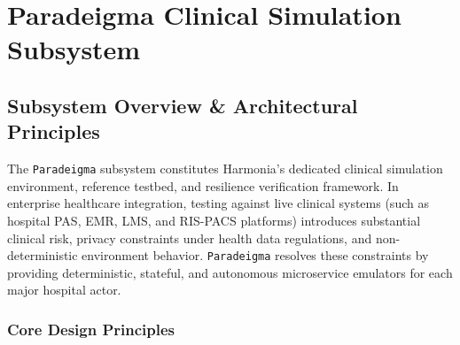 
\chapter{Paradeigma Clinical Simulation Subsystem}
\label{app:paradeigma}

\section{Subsystem Overview \& Architectural Principles}
\label{sec:paradeigma_overview}

The \texttt{Paradeigma} subsystem constitutes Harmonia's dedicated clinical simulation environment, reference testbed, and resilience verification framework. In enterprise healthcare integration, testing against live clinical systems (such as hospital PAS, EMR, LMS, and RIS-PACS platforms) introduces substantial clinical risk, privacy constraints under health data regulations, and non-deterministic environment behavior. \texttt{Paradeigma} resolves these constraints by providing deterministic, stateful, and autonomous microservice emulators for each major hospital actor.

\subsection{Core Design Principles}

